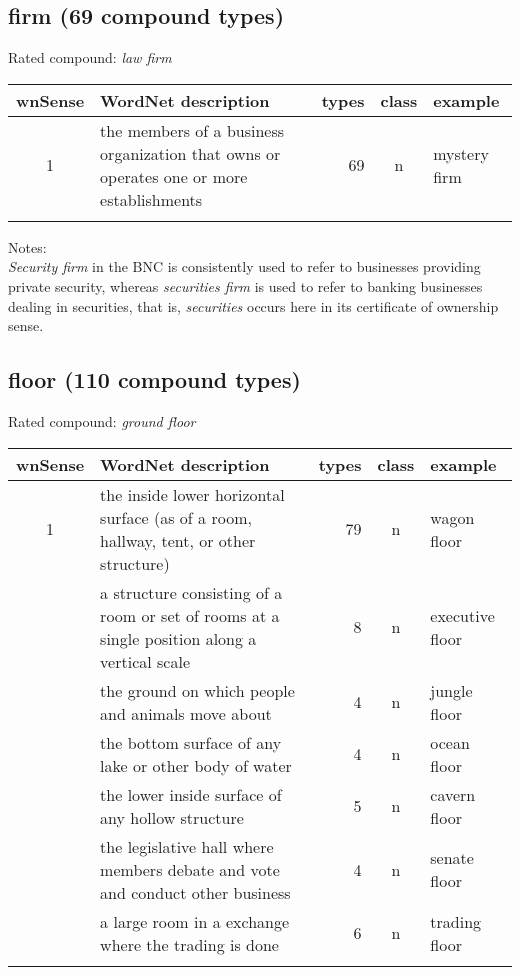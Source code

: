 \subsection{firm      (69 compound types)}
Rated compound: \emph{law firm}

\vspace*{1ex}

\noindent
\begin{longtable}{c>{\raggedright\arraybackslash}p{5cm}rc>{\raggedright\arraybackslash}p{2cm}}\lsptoprule
{\small wnSense}&WordNet description&types&class&example\\\midrule
1&the members of a business organization that owns or operates one or more establishments&69&n&mystery firm\\\lspbottomrule
\end{longtable}

\noindent
Notes:\\
\emph{Security firm} in the BNC is consistently used to refer to businesses providing private security, whereas \emph{securities firm} is used to refer to banking businesses dealing in securities, that is, \emph{securities} occurs here in its certificate of ownership sense.

\subsection{floor     (110 compound types)}
Rated compound: \emph{ground floor}

\vspace*{1ex}

\noindent
\begin{longtable}{c>{\raggedright\arraybackslash}p{5cm}rc>{\raggedright\arraybackslash}p{2cm}}\lsptoprule
{\small wnSense}&WordNet description&types&class&example\\\midrule
1&the inside lower horizontal surface (as of a room, hallway, tent, or other structure)&79&n&wagon floor\\\tablevspace
2&a structure consisting of a room or set of rooms at a single position along a vertical scale&8&n&executive floor\\\tablevspace
4&the ground on which people and animals move about&4&n&jungle floor\\\tablevspace
5&the bottom surface of any lake or other body of water&4&n&ocean floor\\\tablevspace
6&the lower inside surface of any hollow structure&5&n&cavern floor\\\tablevspace
9&the legislative hall where members debate and vote and conduct other business&4&n&senate floor\\\tablevspace
10&a large room in a exchange where the trading is done&6&n&trading floor\\\lspbottomrule
\end{longtable}

